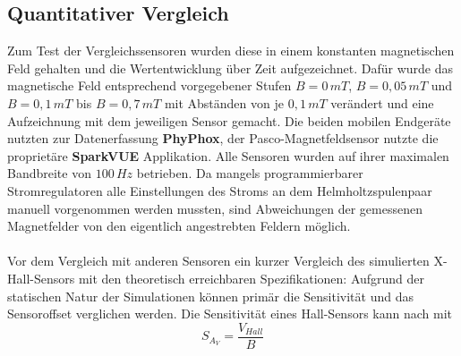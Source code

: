 \documentclass[12pt, a4paper]{article}
\begin{document}
\subsection{Quantitativer Vergleich}
Zum Test der Vergleichssensoren wurden diese in einem konstanten magnetischen Feld gehalten und die Wertentwicklung über Zeit aufgezeichnet. Dafür wurde das magnetische Feld entsprechend vorgegebener Stufen $B=0\,mT$, $B=0,05\,mT$ und $B=0,1\,mT$ bis $B=0,7\,mT$ mit Abständen von je $0,1\,mT$ verändert und eine Aufzeichnung mit dem jeweiligen Sensor gemacht. Die beiden mobilen Endgeräte nutzten zur Datenerfassung \textbf{PhyPhox}, der Pasco-Magnetfeldsensor nutzte die proprietäre \textbf{SparkVUE} Applikation. Alle Sensoren wurden auf ihrer maximalen Bandbreite von $100\,Hz$ betrieben.\newline
Da mangels programmierbarer Stromregulatoren alle Einstellungen des Stroms an dem Helmholtzspulenpaar manuell vorgenommen werden mussten, sind Abweichungen der gemessenen Magnetfelder von den eigentlich angestrebten Feldern möglich.\paragraph{}

Vor dem Vergleich mit anderen Sensoren ein kurzer Vergleich des simulierten X-Hall-Sensors mit den theoretisch erreichbaren Spezifikationen:\newline
Aufgrund der statischen Natur der Simulationen können primär die Sensitivität und das Sensoroffset verglichen werden. Die Sensitivität eines Hall-Sensors kann nach \cite{heidari15} mit 
\begin{equation}
	{S_{A_V}}=\frac{V_{Hall}}{B}
	\tag{5.1}
	\label{5.1}
\end{equation}
\end{document}
